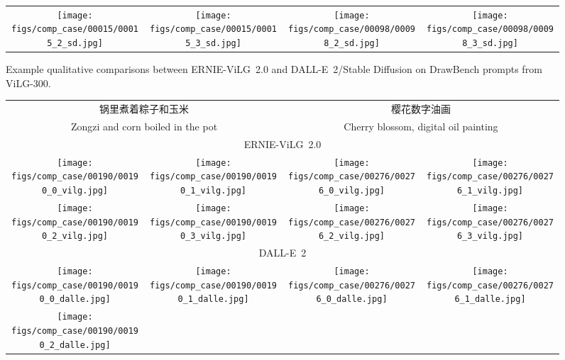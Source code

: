 \documentclass[10pt,twocolumn,letterpaper]{article}
\begin{document}
\begin{CJK*}{UTF8}{gbsn}
\begin{figure*}[htbp]
\begin{tabular}{c@{\hskip 2.5pt}c@{\hskip 8pt}c@{\hskip 2.5pt}c}
{\texttt{[image: figs/comp\_case/00015/00015\_2\_sd.jpg]}} &
{\texttt{[image: figs/comp\_case/00015/00015\_3\_sd.jpg]}} &
{\texttt{[image: figs/comp\_case/00098/00098\_2\_sd.jpg]}} &
{\texttt{[image: figs/comp\_case/00098/00098\_3\_sd.jpg]}} \\
\end{tabular}
\caption{Example qualitative comparisons between ERNIE-ViLG~2.0 and DALL-E~2/Stable Diffusion on DrawBench prompts from ViLG-300.}
\label{fig:case_drawbench}
\end{figure*}
\end{CJK*}

\begin{CJK*}{UTF8}{gbsn}
\begin{figure*}[htbp]
\centering
\begin{tabular}{c@{\hskip 2.5pt}c@{\hskip 8pt}c@{\hskip 2.5pt}c}
\multicolumn{2}{c}{\scriptsize 锅里煮着粽子和玉米} & 
\multicolumn{2}{c}{\scriptsize 樱花数字油画} \\
\multicolumn{2}{c}{\scriptsize Zongzi and corn boiled in the pot} & 
\multicolumn{2}{c}{\scriptsize Cherry blossom, digital oil painting} \\
\multicolumn{4}{c}{\scriptsize ERNIE-ViLG~2.0} \\
{\texttt{[image: figs/comp\_case/00190/00190\_0\_vilg.jpg]}} &
{\texttt{[image: figs/comp\_case/00190/00190\_1\_vilg.jpg]}} &
{\texttt{[image: figs/comp\_case/00276/00276\_0\_vilg.jpg]}} &
{\texttt{[image: figs/comp\_case/00276/00276\_1\_vilg.jpg]}} \\
{\texttt{[image: figs/comp\_case/00190/00190\_2\_vilg.jpg]}} &
{\texttt{[image: figs/comp\_case/00190/00190\_3\_vilg.jpg]}} &
{\texttt{[image: figs/comp\_case/00276/00276\_2\_vilg.jpg]}} &
{\texttt{[image: figs/comp\_case/00276/00276\_3\_vilg.jpg]}} \\
\multicolumn{4}{c}{\scriptsize DALL-E~2} \\
{\texttt{[image: figs/comp\_case/00190/00190\_0\_dalle.jpg]}} &
{\texttt{[image: figs/comp\_case/00190/00190\_1\_dalle.jpg]}} &
{\texttt{[image: figs/comp\_case/00276/00276\_0\_dalle.jpg]}} &
{\texttt{[image: figs/comp\_case/00276/00276\_1\_dalle.jpg]}} \\
{\texttt{[image: figs/comp\_case/00190/00190\_2\_dalle.jpg]}} &

\end{tabular}
\end{figure*}
\end{CJK*}
\end{document}
